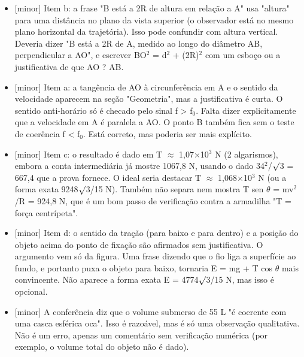 \documentclass{article}%
\begin{document}
\begin{itemize}%
\item%
{[}minor{]} Item b: a frase "B está a 2R de altura em relação a A" usa "altura" para uma distância no plano da vista superior (o observador está no mesmo plano horizontal da trajetória). Isso pode confundir com altura vertical. Deveria dizer "B está a 2R de A, medido ao longo do diâmetro AB, perpendicular a AO", e escrever BO$^2$ = d$^2$ + (2R)$^2$ com um esboço ou a justificativa de que AO ? AB.%
\item%
{[}minor{]} Item a: a tangência de AO à circunferência em A e o sentido da velocidade aparecem na seção "Geometria", mas a justificativa é curta. O sentido anti{-}horário só é checado pelo sinal f > f$_{0}$. Falta dizer explicitamente que a velocidade em A é paralela a AO. O ponto B também fica sem o teste de coerência f < f$_{0}$. Está correto, mas poderia ser mais explícito.%
\item%
{[}minor{]} Item c: o resultado é dado em T $\approx$ 1,07$\times$10$^3$ N (2 algarismos), embora a conta intermediária já mostre 1067,8 N, usando o dado 34$^2$/$\surd$3 = 667,4 que a prova fornece. O ideal seria destacar T $\approx$ 1,068$\times$10$^3$ N (ou a forma exata 9248$\surd$3/15 N). Também não separa nem mostra T sen $\theta$ = mv$^2$/R = 924,8 N, que é um bom passo de verificação contra a armadilha "T = força centrípeta".%
\item%
{[}minor{]} Item d: o sentido da tração (para baixo e para dentro) e a posição do objeto acima do ponto de fixação são afirmados sem justificativa. O argumento vem só da figura. Uma frase dizendo que o fio liga a superfície ao fundo, e portanto puxa o objeto para baixo, tornaria E = mg + T cos $\theta$ mais convincente. Não aparece a forma exata E = 4774$\surd$3/15 N, mas isso é opcional.%
\item%
{[}minor{]} A conferência diz que o volume submerso de 55 L "é coerente com uma casca esférica oca". Isso é razoável, mas é só uma observação qualitativa. Não é um erro, apenas um comentário sem verificação numérica (por exemplo, o volume total do objeto não é dado).%
\end{itemize}%
\end{document}
